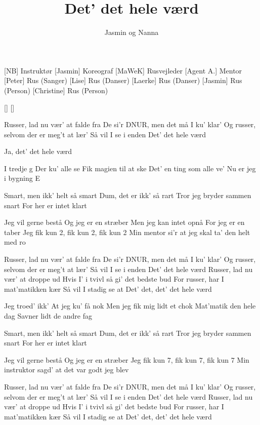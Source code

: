 \documentclass[a4paper,11pt]{article}
\title{Det' det hele værd}
\author{Jasmin og Nanna}
\begin{document}
\maketitle

\begin{roles}
[NB] Instruktør
[Jasmin] Koreograf
[MaWeK] Rusvejleder
[Agent A.] Mentor
[Peter] Rus (Sanger)
[Lise] Rus (Danser)
[Laerke] Rus (Danser)
[Jasmin] Rus (Person)
[Christine] Rus (Person)
\end{roles}

\begin{props}
[]
[]
\end{props}

\begin{song}
 Russer, lad nu vær' at falde fra
De si'r DNUR, men det må I ku' klar'
Og russer, selvom der er meg't at lær'
Så vil I se i enden
Det' det hele værd

 Ja, det' det hele værd

 I tredje g
Der ku' alle se
Fik magien til at ske
Det' en ting som alle ve'
Nu er jeg i bygning E

Smart, men ikk' helt så smart
Dum, det er ikk' så rart
Tror jeg bryder sammen snart
For her er intet klart

Jeg vil gerne bestå
Og jeg er en stræber
Men jeg kan intet opnå
For jeg er en taber
Jeg fik kun 2, fik kun 2, fik kun 2
Min mentor si'r at jeg skal ta' den helt med ro

 Russer, lad nu vær' at falde fra
De si'r DNUR, men det må I ku' klar'
Og russer, selvom der er meg't at lær'
Så vil I se i enden
Det' det hele værd
Russer, lad nu vær' at droppe ud
Hvis I' i tvivl så gi' det bedste bud
For russer, har I mat'matikken kær
Så vil I stadig se at
Det' det, det' det hele værd

 Jeg troed' ikk'
At jeg ku' få nok
Men jeg fik mig lidt et chok
Mat'matik den hele dag
Savner lidt de andre fag

Smart, men ikk' helt så smart
Dum, det er ikk' så rart
Tror jeg bryder sammen snart
For her er intet klart

Jeg vil gerne bestå
Og jeg er en stræber
Jeg fik kun 7, fik kun 7, fik kun 7
Min instruktor sagd' at det var godt jeg blev

 Russer, lad nu vær' at falde fra
De si'r DNUR, men det må I ku' klar'
Og russer, selvom der er meg't at lær'
Så vil I se i enden
Det' det hele værd
Russer, lad nu vær' at droppe ud
Hvis I' i tvivl så gi' det bedste bud
For russer, har I mat'matikken kær
Så vil I stadig se at
Det' det, det' det hele værd


\end{song}
\end{document}
